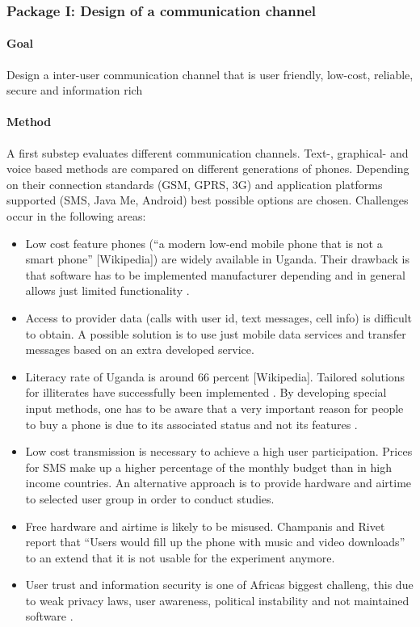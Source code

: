 \documentclass[11pt]{article}
\begin{document}
\subsubsection*{Package I: Design of a communication channel}
\paragraph{Goal} Design a inter-user communication channel that is user friendly, low-cost, reliable, secure and information rich
\paragraph{Method} A first substep evaluates different communication channels. Text-, graphical- and voice based methods are compared on different generations of phones. Depending on their connection standards (GSM, GPRS, 3G) and application platforms supported (SMS, Java Me, Android) best possible options are chosen. Challenges occur in the following areas:
\begin{itemize}
 \item Low cost feature phones (``a modern low-end mobile phone that is not a smart phone'' [Wikipedia]) are widely available in Uganda. Their drawback is that software has to be implemented manufacturer depending and in general allows just limited functionality \cite{champanis2012reporting}.
 \item Access to provider data (calls with user id, text messages, cell info) is difficult to obtain. A possible solution is to use just mobile data services and transfer messages based on an extra developed service.
 \item Literacy rate of Uganda is around 66 percent [Wikipedia]. Tailored solutions for illiterates have successfully been implemented \cite{brown2012water}. By developing special input methods, one has to be aware that a very important reason for people to buy a phone is due to its associated status and not its features \cite{knoche2012text}.
 \item Low cost transmission is necessary to achieve a high user participation. Prices for SMS make up a higher percentage of the monthly budget than in high income countries. An alternative approach is to provide hardware and airtime to selected user group in order to conduct studies.
 \item Free hardware and airtime is likely to be misused. Champanis and Rivet report that ``Users would fill up the phone with music and video downloads'' \cite{champanis2012reporting} to an extend that it is not usable for the experiment anymore.
 \item User trust and information security is one of Africas biggest challeng, this due to weak privacy laws, user awareness, political instability and not maintained software \cite{goodman2010coming}.
\end{itemize}
\end{document}
